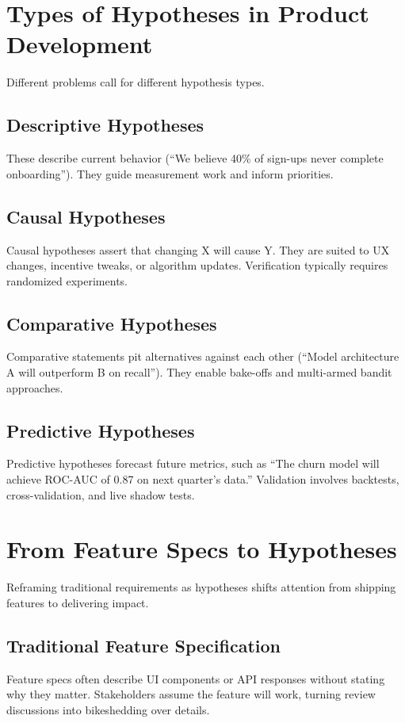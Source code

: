 \section{Types of Hypotheses in Product Development}
\label{sec:hypothesis-types}

Different problems call for different hypothesis types.

\subsection{Descriptive Hypotheses}
These describe current behavior (``We believe 40\% of sign-ups never complete onboarding''). They guide measurement work and inform priorities.

\subsection{Causal Hypotheses}
Causal hypotheses assert that changing X will cause Y. They are suited to UX changes, incentive tweaks, or algorithm updates. Verification typically requires randomized experiments.

\subsection{Comparative Hypotheses}
Comparative statements pit alternatives against each other (``Model architecture A will outperform B on recall''). They enable bake-offs and multi-armed bandit approaches.

\subsection{Predictive Hypotheses}
Predictive hypotheses forecast future metrics, such as ``The churn model will achieve ROC-AUC of 0.87 on next quarter's data.'' Validation involves backtests, cross-validation, and live shadow tests.

\section{From Feature Specs to Hypotheses}
\label{sec:features-to-hypotheses}

Reframing traditional requirements as hypotheses shifts attention from shipping features to delivering impact.

\subsection{Traditional Feature Specification}
Feature specs often describe UI components or API responses without stating why they matter. Stakeholders assume the feature will work, turning review discussions into bikeshedding over details.


